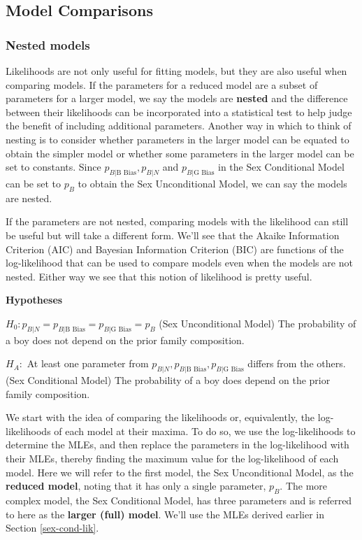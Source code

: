 \documentclass[
]{krantz}
\newcommand{\neutral}{p_{B|N}}
\newcommand{\gbias}{p_{B|\textrm{G Bias}}}
\newcommand{\bbias}{p_{B|\textrm{B Bias}}}
\begin{document}
\hypertarget{sec-lrtest}{%
\subsection{Model Comparisons}\label{sec-lrtest}}

\hypertarget{nested-models}{%
\subsubsection{Nested models}\label{nested-models}}

Likelihoods are not only useful for fitting models, but they are also useful when comparing models. If the parameters for a reduced model are a subset of parameters for a larger model, we say the models are \textbf{nested}  and the difference between their likelihoods can be incorporated into a statistical test to help judge the benefit of including additional parameters. Another way in which to think of nesting is to consider whether parameters in the larger model can be equated to obtain the simpler model or whether some parameters in the larger model can be set to constants. Since \(\bbias, \neutral\) and \(\gbias\) in the Sex Conditional Model can be set to \(p_B\) to obtain the Sex Unconditional Model, we can say the models are nested.

If the parameters are not nested, comparing models with the likelihood can still be useful but will take a different form. We'll see that the Akaike Information Criterion (AIC) and Bayesian Information Criterion (BIC) are functions of the log-likelihood that can be used to compare models even when the models are not nested. Either way we see that this notion of likelihood is pretty useful.

\textbf{Hypotheses}

\(H_0: \neutral=\bbias=\gbias=p_B\) (Sex Unconditional Model)
The probability of a boy does not depend on the prior family composition.

\(H_A:\) At least one parameter from \(\neutral, \bbias,\gbias\) differs from the others. (Sex Conditional Model)
The probability of a boy does depend on the prior family composition.

We start with the idea of comparing the likelihoods or, equivalently, the log-likelihoods of each model at their maxima. To do so, we use the log-likelihoods to determine the MLEs, and then replace the parameters in the log-likelihood with their MLEs, thereby finding the maximum value for the log-likelihood of each model. Here we will refer to the first model, the Sex Unconditional Model, as the \textbf{reduced model},  noting that it has only a single parameter, \(p_B\). The more complex model, the Sex Conditional Model, has three parameters and is referred to here as the \textbf{larger (full) model}. We'll use the MLEs derived earlier in Section \ref{sex-cond-lik}.
\end{document}
